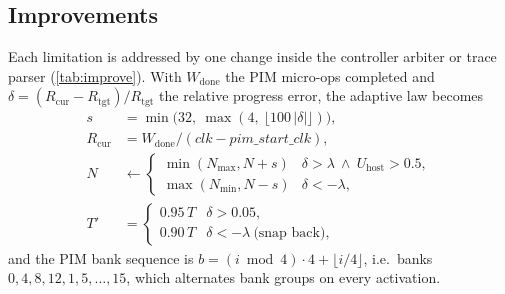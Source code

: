 \documentclass[conference]{IEEEtran}
\begin{document}
\subsection{Improvements}
Each limitation is addressed by one change inside the controller arbiter or trace parser (\cref{tab:improve}). With $W_{\mathrm{done}}$ the PIM micro-ops completed and $\delta=(R_{\mathrm{cur}}-R_{\mathrm{tgt}})/R_{\mathrm{tgt}}$ the relative progress error, the adaptive law becomes
\begin{align}
s &= \min\bigl(32,\ \max(4,\ \lfloor 100\,|\delta|\rfloor)\bigr),\\
R_{\mathrm{cur}} &= W_{\mathrm{done}}/(\mathit{clk}-\mathit{pim\_start\_clk}),\\
N &\leftarrow \begin{cases}\min(N_{\max},N+s) & \delta>\lambda\ \wedge\ U_{\mathrm{host}}>0.5,\\ \max(N_{\min},N-s) & \delta<-\lambda,\end{cases}\\
T' &= \begin{cases}0.95\,T & \delta>0.05,\\ 0.90\,T & \delta<-\lambda\ \text{(snap back)},\end{cases}
\end{align}
and the PIM bank sequence is $b=(i \bmod 4)\cdot 4+\lfloor i/4\rfloor$, i.e.\ banks $0,4,8,12,1,5,\ldots,15$, which alternates bank groups on every activation.
\end{document}
